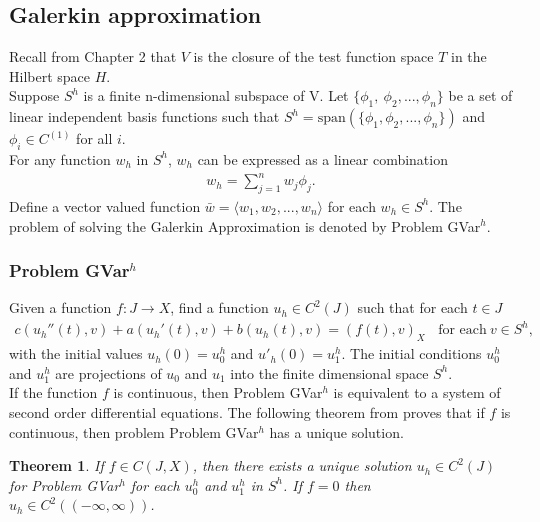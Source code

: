 \documentclass[../../main.tex]{subfiles}
\begin{document}
\subsection{Galerkin approximation}
 Recall from Chapter 2 that $V$ is the closure of the test function space $T$ in the Hilbert space $H$.\\
 
 Suppose $S^h$ is a finite n-dimensional subspace of V. Let $\{\phi_1, \ \phi_2,...,\phi_n\}$ be a set of linear independent basis functions such that $S^h = \textrm{span}(\{\phi_1, \phi_2, ..., \phi_n \})$ and $\phi_i \in C^{(1)}$ for all $i$.\\

For any function $w_h$ in $S^h$, $w_h$ can be expressed as a linear combination
\begin{eqnarray*}
	w_h = \sum_{j=1}^n w_j \phi_j.
\end{eqnarray*} Define a vector valued function $\bar{w} = \langle w_1,w_2,...,w_n \rangle$ for each $w_h \in S^h$. The problem of solving the Galerkin Approximation is denoted by Problem GVar$^h$.

\subsubsection*{Problem GVar$^h$}
Given a function $f: J \rightarrow X$, find a function $u_h \in C^2(J)$ such that for each $t\in J$
\begin{eqnarray}
 c(u_h''(t),v)+a(u_h'(t),v)+b(u_h(t),v)= (f(t),v)_{X} \ \ \ \ \textrm{for each} \ v \in S^h, \label{DC_E2} 
\end{eqnarray}
with the initial values $u_h(0)=u^h_{0}$ and $u'_h(0)=u^h_{1}$. The initial conditions $u^h_{0}$ and $u^h_{1}$ are projections of $u_0$ and $u_1$ into the finite dimensional space $S^h$.\\

If the function $f$ is continuous, then Problem GVar$^h$ is equivalent to a system of second order differential equations. The following theorem from \cite{BV13} proves that if $f$ is continuous, then problem Problem GVar$^h$ has a unique solution.

\newtheorem{DC_Thm2}{Theorem}
\begin{DC_Thm2} \label{DC_THM2}
	If $f \in C(J,X)$, then there exists a unique solution $u_h \in C^2(J)$ for Problem GVar$^h$ for each $u_0^h$ and $u_1^h$ in $S^h$. If $f = 0$ then $u_h \in C^2((-\infty, \infty))$.
\end{DC_Thm2}
\end{document}
